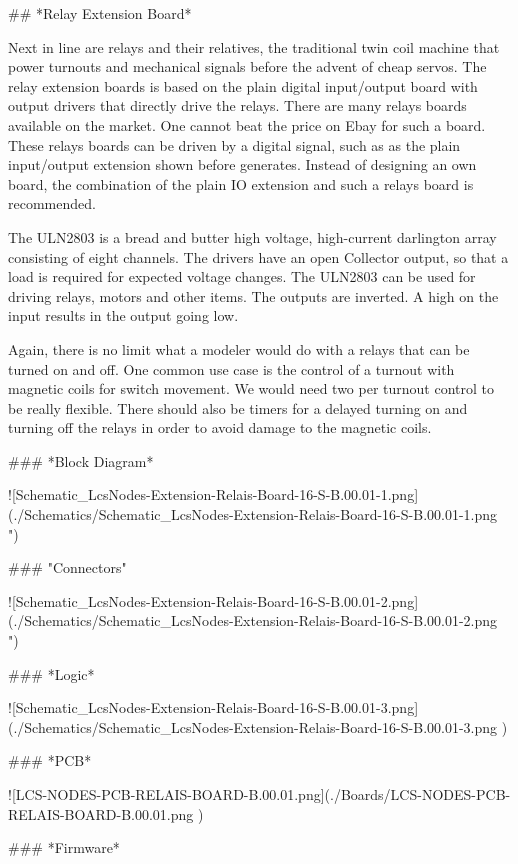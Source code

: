 ## *Relay Extension Board*

Next in line are relays and their relatives, the traditional twin coil machine that power turnouts and mechanical signals before the advent of cheap servos. The relay extension boards is based on the plain digital input/output board with output drivers that directly drive the relays. There are many relays boards available on the market. One cannot beat the price on Ebay for such a board. These relays boards can be driven by a digital signal, such as as the plain input/output extension shown before generates. Instead of designing an own board, the combination of the plain IO extension and such a relays board is recommended.

The ULN2803 is a bread and butter high voltage, high-current darlington array consisting of eight channels. The drivers have an open Collector output, so that a load is required for expected voltage changes. The ULN2803 can be used for driving relays, motors and other items. The outputs are inverted. A high on the input results in the output going low.


Again, there is no limit what a modeler would do with a relays that can be turned on and off. One common use case is the control of a turnout with magnetic coils for switch movement. We would need two per turnout control to be really flexible. There should also be timers for a delayed turning on and turning off the relays in order to avoid damage to the magnetic coils.

### *Block Diagram*

![Schematic_LcsNodes-Extension-Relais-Board-16-S-B.00.01-1.png](./Schematics/Schematic_LcsNodes-Extension-Relais-Board-16-S-B.00.01-1.png ")

### "Connectors"

![Schematic_LcsNodes-Extension-Relais-Board-16-S-B.00.01-2.png](./Schematics/Schematic_LcsNodes-Extension-Relais-Board-16-S-B.00.01-2.png ")

### *Logic*

![Schematic_LcsNodes-Extension-Relais-Board-16-S-B.00.01-3.png](./Schematics/Schematic_LcsNodes-Extension-Relais-Board-16-S-B.00.01-3.png )

### *PCB*

![LCS-NODES-PCB-RELAIS-BOARD-B.00.01.png](./Boards/LCS-NODES-PCB-RELAIS-BOARD-B.00.01.png )

### *Firmware*